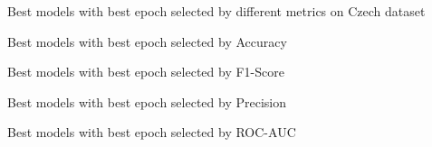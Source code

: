 \begin{table}[!htbp]
    \caption{Best models with best epoch selected by different metrics on Czech dataset}
    \label{tab:czech_best_models}
    \centering

    \begin{subtable}[t]{\linewidth}
        \footnotesize
        \caption{Best models with best epoch selected by Accuracy}
        
    \end{subtable}

    \vspace{1em}

    \begin{subtable}[t]{\linewidth}
        \footnotesize
        \caption{Best models with best epoch selected by F1-Score}
        
    \end{subtable}

    \vspace{1em}

    \begin{subtable}[t]{\linewidth}
        \footnotesize
        \caption{Best models with best epoch selected by Precision}
        
    \end{subtable}


    \vspace{1em}

    \begin{subtable}[t]{\linewidth}
        \footnotesize
        \caption{Best models with best epoch selected by ROC-AUC}
        
    \end{subtable}



\end{table}